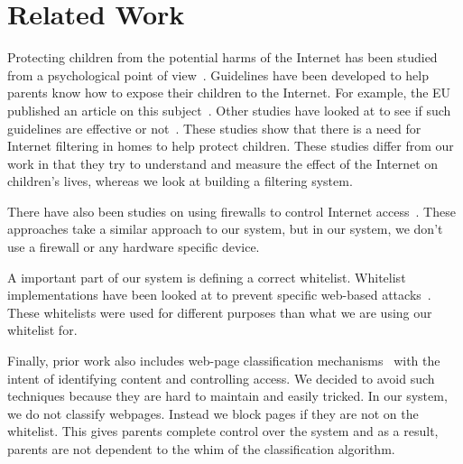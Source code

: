 
\section{Related Work}

Protecting children from the potential harms of the Internet has been studied
from a psychological point of view~\cite{ybarra2005exposure, ho_statistical}.
Guidelines have been developed to help parents know how to expose their
children to the Internet. For example, the EU published an article on this
subject~\cite{holloway2013zero, livingstone2010risks}. Other studies have
looked at to see if such guidelines are effective or
not~\cite{livingstone2008parental}. These studies show that there is a need for
Internet filtering in homes to help protect children. These studies differ from
our work in that they try to understand and measure the effect of the Internet
on children's lives, whereas we look at building a filtering system.

There have also been studies on using firewalls to control Internet
access~\cite{ivanovic, nguyen}. These approaches take a similar approach to
our system, but in our system, we don't use a firewall or any hardware specific
device.

A important part of our system is defining a correct whitelist. Whitelist
implementations have been looked at to prevent specific web-based
attacks~\cite{han_automated_whitelist, iha_implementation}. These whitelists
were used for different purposes than what we are using our whitelist for.

Finally, prior work also includes web-page classification
mechanisms~\cite{baykan_et_al_url_based_classification,
chen_et_al_novel_web_page_filtering, ho_statistical} with the intent of
identifying content and controlling access. We decided to avoid such techniques
because they are hard to maintain and easily tricked. In our system, we do not
classify webpages. Instead we block pages if they are not on the whitelist.
This gives parents complete control over the system and as a result, parents
are not dependent to the whim of the classification algorithm.
